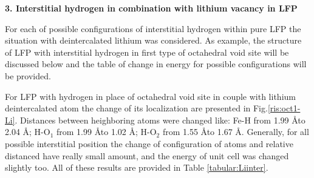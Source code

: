 \textbf{3. Interstitial hydrogen in combination with lithium vacancy in LFP}

For each of possible configurations of interstitial hydrogen within pure LFP the situation with deintercalated lithium was considered. As example, the structure of LFP with interstitial hydrogen in first type of octahedral void site will be discussed below and the table of change in energy for possible configurations will be provided.

For LFP with hydrogen in place of octahedral void site in couple with lithium deintercalated atom the change of its localization are presented in Fig.\ref{ris:oct1-Li}. Distances between heighboring atoms were changed like: Fe-H from 1.99 \AA to 2.04 \AA; H-O$_1$ from 1.99 \AA to 1.02 \AA; H-O$_2$ from 1.55 \AA to 1.67 \AA. Generally, for all possible interstitial position the change of configuration of atoms and relative distanced have really small amount, and the energy of unit cell was changed slightly too. All of these results are provided in Table \ref{tabular:Liinter}.  

